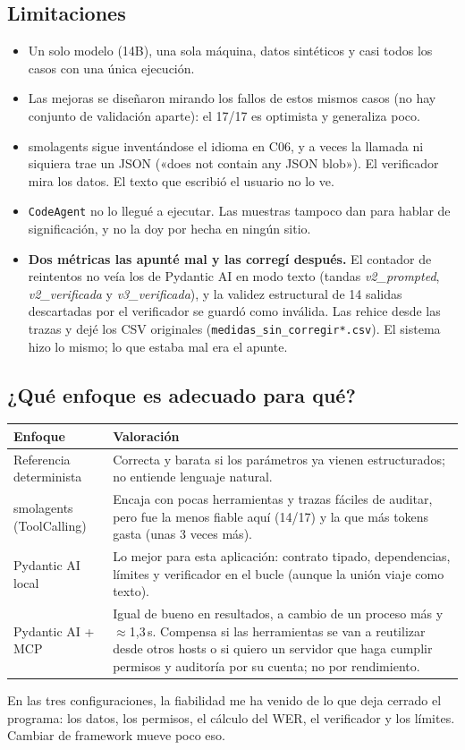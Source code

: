 \documentclass[10pt,a4paper]{article}
\newcommand{\cod}[1]{\texttt{\small #1}}
\begin{document}
\subsection{Limitaciones}
\begin{itemize}
\item Un solo modelo (14B), una sola máquina, datos sintéticos y casi todos los casos con una única ejecución.
\item Las mejoras se diseñaron mirando los fallos de estos mismos casos (no hay conjunto de validación aparte): el 17/17 es optimista y generaliza poco.
\item smolagents sigue inventándose el idioma en C06, y a veces la llamada ni siquiera trae un JSON («does not contain any JSON blob»). El verificador mira los datos. El texto que escribió el usuario no lo ve.
\item \cod{CodeAgent} no lo llegué a ejecutar. Las muestras tampoco dan para hablar de significación, y no la doy por hecha en ningún sitio.
\item \textbf{Dos métricas las apunté mal y las corregí después.} El contador de reintentos no veía los de Pydantic AI en modo texto (tandas \emph{v2\_prompted}, \emph{v2\_verificada} y \emph{v3\_verificada}), y la validez estructural de 14 salidas descartadas por el verificador se guardó como inválida. Las rehice desde las trazas y dejé los CSV originales (\cod{medidas\_sin\_corregir*.csv}). El sistema hizo lo mismo; lo que estaba mal era el apunte.
\end{itemize}

\subsection{¿Qué enfoque es adecuado para qué?}
\begin{center}\small
\begin{tabularx}{\linewidth}{@{}>{\raggedright\arraybackslash}p{3.1cm}>{\raggedright\arraybackslash}X@{}}\toprule
Enfoque & Valoración\\\midrule
Referencia determinista & Correcta y barata si los parámetros ya vienen estructurados; no entiende lenguaje natural.\\
smolagents (ToolCalling) & Encaja con pocas herramientas y trazas fáciles de auditar, pero fue la menos fiable aquí (14/17) y la que más tokens gasta (unas 3 veces más).\\
Pydantic AI local & Lo mejor para esta aplicación: contrato tipado, dependencias, límites y verificador en el bucle (aunque la unión viaje como texto).\\
Pydantic AI + MCP & Igual de bueno en resultados, a cambio de un proceso más y $\approx$1,3\,s. Compensa si las herramientas se van a reutilizar desde otros hosts o si quiero un servidor que haga cumplir permisos y auditoría por su cuenta; no por rendimiento.\\\bottomrule
\end{tabularx}
\end{center}
En las tres configuraciones, la fiabilidad me ha venido de lo que deja cerrado el programa: los datos, los permisos, el cálculo del WER, el verificador y los límites. Cambiar de framework mueve poco eso.
\end{document}

